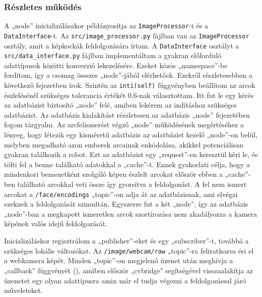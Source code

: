 \subsubsection{Részletes működés}
A „node” inicializálásakor példányosítja az \verb|ImageProcessor|-t és a \verb|DataInterface|-t. Az \verb|src/image_processor.py| fájlban van az \verb|ImageProcessor| osztály, amit a képkockák feldolgozására írtam. A \verb|DataInterface| osztályt a \verb|src/data_interface.py| fájlban implementáltam a gyakran előforduló adattípusok közötti konverzió lekezelésére. Ezeket közös „namespace”-be fordítom, így a csomag össszes „node”-jából elérhetőek. Ezekről részletesebben a következő fejezetben írok. Szintén az \verb|inti(self)| függvényben beállítom az arcok észlelésénél szükséges tolerancia értékét 0.6-nak választottam. Itt fut le egy kérés az adatbázist biztosító „node” felé, amiben lekérem az indításhoz szükséges adatbázist. Az adatbázis kialakítást részletesen az adatbázis „node” fejezetében fogom tárgyalni. Az arcfelismerést végző „node” működésének megértéséhez a lényeg, hogy létezik egy kisméretű adatbázis az adatbázist kezelő „node”-on belül, melyben megadható azon emberek arcainak enkódolása, akikkel potenciálisan gyakran találkozik a robot. Ezt az adatbázist egy „request”-en keresztül kéri le, és tölti fel a benne található adatokkal a „cache”-t. Ennek gyakorlati célja, hogy a mindenkori bemenetként szolgáló képen észlelt arcokat először ebben a „cache”-ben található arcokkal veti össze így gyorsítva a feldolgozást. A fel nem ismert arcokat a \verb|/face/encodings| „topic”-on adja át az adatbázisnak, ami elvégzi ezeknek a feldolgozását szimultán. Egyszerre fut a két „node”, így az adatbázis „node”-ban a megkapott ismeretlen arcok szortírozása nem akadályozza a kamera képének valós idejű feldolgozását.

Inicializáláskor regisztrálom a „publisher”-eket és egy „subscriber”-t, továbbá a szükséges lokális változókat.  
Az \verb|/image/webcam/raw| „topic”-ra feliratkozva éri el a webkamera képét. Minden „topic”-on megjelenő üzenet után meghívja a „callback” függvényét (), amiben először „cv\textunderscore bridge" segítségével visszaalakítja az üzenetet egy olyan adattípusra amin már el tudja végezni a feldolgozással járó műveleteket. 

